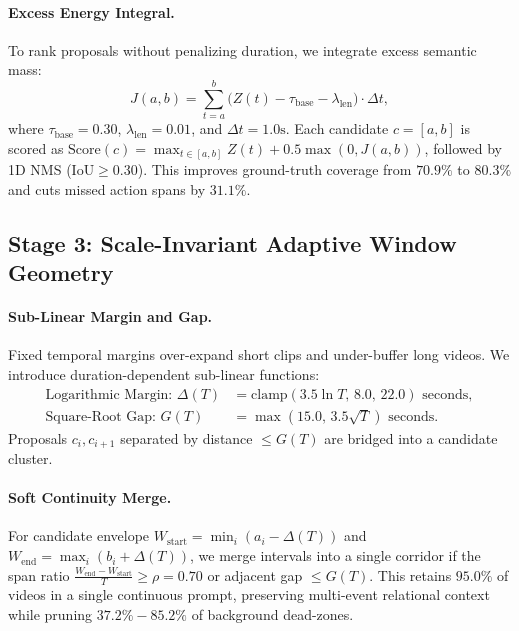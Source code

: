 \paragraph{Excess Energy Integral.} To rank proposals without penalizing duration, we integrate excess semantic mass:
\begin{equation}
    J(a, b) = \sum_{t=a}^{b} \big(Z(t) - \tau_{\text{base}} - \lambda_{\text{len}}\big) \cdot \Delta t,
    \label{eq:excess_energy}
\end{equation}
where $\tau_{\text{base}} = 0.30$, $\lambda_{\text{len}} = 0.01$, and $\Delta t = 1.0\text{s}$. Each candidate $c = [a, b]$ is scored as $\text{Score}(c) = \max_{t \in [a, b]} Z(t) + 0.5 \max(0, J(a, b))$, followed by 1D NMS ($\text{IoU} \ge 0.30$). This improves ground-truth coverage from $70.9\%$ to $80.3\%$ and cuts missed action spans by $31.1\%$.


\subsection{Stage 3: Scale-Invariant Adaptive Window Geometry}
\label{sec:stage3}

\paragraph{Sub-Linear Margin and Gap.} Fixed temporal margins over-expand short clips and under-buffer long videos. We introduce duration-dependent sub-linear functions:
\begin{align}
    \text{Logarithmic Margin: } \Delta(T) &= \text{clamp}(3.5 \ln T, \, 8.0, \, 22.0)\text{ seconds}, \label{eq:log_margin} \\
    \text{Square-Root Gap: } G(T) &= \max(15.0, \, 3.5\sqrt{T})\text{ seconds}. \label{eq:sqrt_gap}
\end{align}
Proposals $c_i, c_{i+1}$ separated by distance $\le G(T)$ are bridged into a candidate cluster.

\paragraph{Soft Continuity Merge.} For candidate envelope $W_{\text{start}} = \min_i (a_i - \Delta(T))$ and $W_{\text{end}} = \max_i (b_i + \Delta(T))$, we merge intervals into a single corridor if the span ratio $\frac{W_{\text{end}} - W_{\text{start}}}{T} \ge \rho = 0.70$ or adjacent gap $\le G(T)$. This retains $95.0\%$ of videos in a single continuous prompt, preserving multi-event relational context while pruning $37.2\%-85.2\%$ of background dead-zones.

